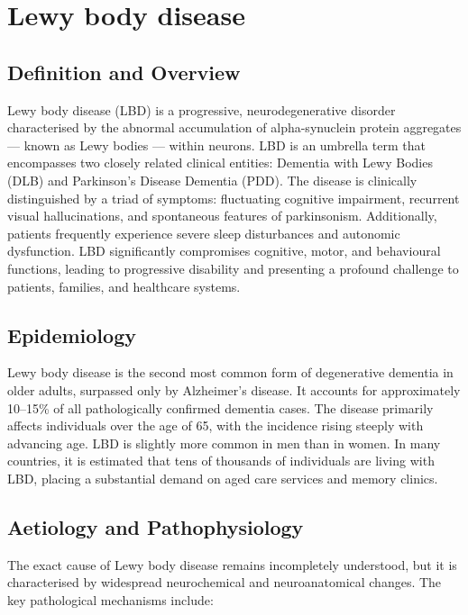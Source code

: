 \chapter{Lewy body disease}

\section*{Definition and Overview}
Lewy body disease (LBD) is a progressive, neurodegenerative disorder characterised by the abnormal accumulation of alpha-synuclein protein aggregates --- known as Lewy bodies --- within neurons. LBD is an umbrella term that encompasses two closely related clinical entities: Dementia with Lewy Bodies (DLB) and Parkinson's Disease Dementia (PDD). The disease is clinically distinguished by a triad of symptoms: fluctuating cognitive impairment, recurrent visual hallucinations, and spontaneous features of parkinsonism. Additionally, patients frequently experience severe sleep disturbances and autonomic dysfunction. LBD significantly compromises cognitive, motor, and behavioural functions, leading to progressive disability and presenting a profound challenge to patients, families, and healthcare systems.

\section*{Epidemiology}
Lewy body disease is the second most common form of degenerative dementia in older adults, surpassed only by Alzheimer's disease. It accounts for approximately 10--15\% of all pathologically confirmed dementia cases. The disease primarily affects individuals over the age of 65, with the incidence rising steeply with advancing age. LBD is slightly more common in men than in women. In many countries, it is estimated that tens of thousands of individuals are living with LBD, placing a substantial demand on aged care services and memory clinics.

\section*{Aetiology and Pathophysiology}
The exact cause of Lewy body disease remains incompletely understood, but it is characterised by widespread neurochemical and neuroanatomical changes. The key pathological mechanisms include:

